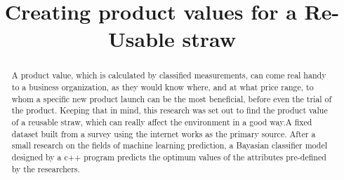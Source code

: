 \documentclass[conference]{IEEEtran}
\begin{document}
\title{Creating product values for a Re-Usable straw\\
{\footnotesize \textsuperscript{}
}
}

\author{
\and
{}
\and
{}
\and
{}
}

\maketitle


\begin{abstract}
 A product value, which is calculated by classified measurements, can come real handy to a business organization, as they would know where, and at what price range, to whom a specific new product launch can be the most beneficial, before even the trial of the product. Keeping that in mind, this research was set out to find the product value of a reusable straw, which can really affect the environment in a good way.A fixed dataset built from a survey using the internet works as the primary source. After a small research on the fields of machine learning prediction, a Bayasian classifier  model designed by a c++ program predicts the optimum values of the attributes pre-defined by the researchers.  \\ 
\end{abstract}
\end{document}
